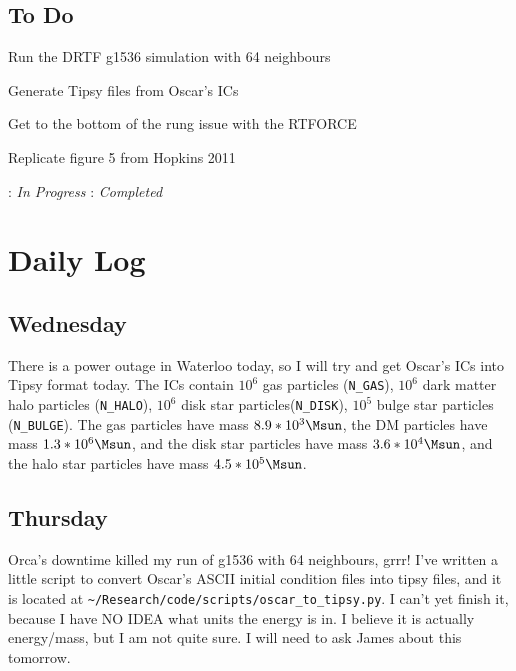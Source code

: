 \documentclass[11pt,letterpaper]{article}
\begin{document}
\subsection*{To Do}
\begin{bullets}
\item[\textleaf] Run the DRTF g1536 simulation with 64 neighbours
\item[\textleaf] Generate Tipsy files from Oscar's ICs
\item[\checkmark] Get to the bottom of the rung issue with the RTFORCE
\item[\textleaf] Replicate figure 5 from Hopkins 2011
\end{bullets}

\textleaf : \textit{In Progress} \qquad \checkmark : \textit{Completed}

\section*{Daily Log}
\subsection*{Wednesday}
There is a power outage in Waterloo today, so I will try and get Oscar's ICs 
into Tipsy format today.  The ICs contain $10^6$ gas particles 
(\verb!N_GAS!),  $10^6$ dark matter halo particles (\verb!N_HALO!), $10^6$
disk star particles(\verb!N_DISK!), $10^5$ bulge star particles 
(\verb!N_BULGE!).  The gas particles have mass $8.9*10^3\Msun$, the DM particles
have mass $1.3*10^6\Msun$, and the disk star particles have mass 
$3.6*10^4\Msun$, and the halo star particles have mass $4.5*10^5\Msun$.
\subsection*{Thursday}
Orca's downtime killed my run of g1536 with 64 neighbours, grrr!  I've written
a little script to convert Oscar's ASCII initial condition files into tipsy
files, and it is located at \verb!~/Research/code/scripts/oscar_to_tipsy.py!. I
can't yet finish it, because I have NO IDEA what units the energy is in.  I 
believe it is actually energy/mass, but I am not quite sure.  I will need to ask
James about this tomorrow.
\end{document}
